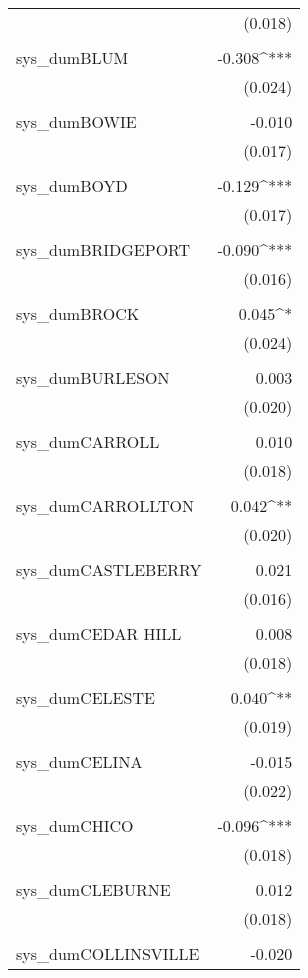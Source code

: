 \begin{table}[!htbp]
\begin{tabular}{@{\extracolsep{5pt}}lD{.}{.}{-3} }
  & (0.018) \\ 
  & \\ 
 sys\_dumBLUM & -0.308^{***} \\ 
  & (0.024) \\ 
  & \\ 
 sys\_dumBOWIE & -0.010 \\ 
  & (0.017) \\ 
  & \\ 
 sys\_dumBOYD & -0.129^{***} \\ 
  & (0.017) \\ 
  & \\ 
 sys\_dumBRIDGEPORT & -0.090^{***} \\ 
  & (0.016) \\ 
  & \\ 
 sys\_dumBROCK & 0.045^{*} \\ 
  & (0.024) \\ 
  & \\ 
 sys\_dumBURLESON & 0.003 \\ 
  & (0.020) \\ 
  & \\ 
 sys\_dumCARROLL & 0.010 \\ 
  & (0.018) \\ 
  & \\ 
 sys\_dumCARROLLTON & 0.042^{**} \\ 
  & (0.020) \\ 
  & \\ 
 sys\_dumCASTLEBERRY & 0.021 \\ 
  & (0.016) \\ 
  & \\ 
 sys\_dumCEDAR HILL & 0.008 \\ 
  & (0.018) \\ 
  & \\ 
 sys\_dumCELESTE & 0.040^{**} \\ 
  & (0.019) \\ 
  & \\ 
 sys\_dumCELINA & -0.015 \\ 
  & (0.022) \\ 
  & \\ 
 sys\_dumCHICO & -0.096^{***} \\ 
  & (0.018) \\ 
  & \\ 
 sys\_dumCLEBURNE & 0.012 \\ 
  & (0.018) \\ 
  & \\ 
 sys\_dumCOLLINSVILLE & -0.020 \\ 

\end{tabular}
\end{table}

